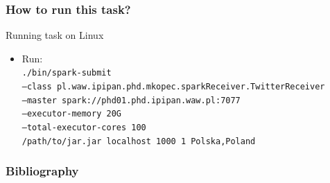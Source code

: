 \documentclass{beamer}
\begin{document}
\begin{frame}
\frametitle{How to run this task?}

\begin{block}{Running task on Linux}
	\begin{itemize}
		\item Run: \\
		\texttt{./bin/spark-submit \\
  --class pl.waw.ipipan.phd.mkopec.sparkReceiver.TwitterReceiver \\
  --master spark://phd01.phd.ipipan.waw.pl:7077 \\
  --executor-memory 20G \\
  --total-executor-cores 100 \\
  /path/to/jar.jar localhost 1000 1 Polska,Poland}
	\end{itemize}
\end{block}

\end{frame}



\begin{frame}[allowframebreaks]
	\frametitle<presentation>{Bibliography}
	\nocite{*}
	
	\tiny
	
\end{frame}
\end{document}
